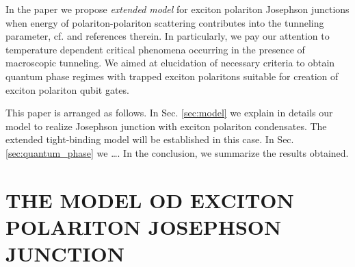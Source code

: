 \documentclass[aps, pre, preprint, groupedaddress, superscriptaddress, showkeys, showpacs] {revtex4-1}
\begin{document}
In the paper we propose \textit{extended model} for exciton polariton Josephson junctions when energy of polariton-polariton scattering contributes into the tunneling parameter, cf. \cite{Borgh,Solnyshkov_2008,Sarchi} and references therein.
In particularly, we pay our attention to temperature dependent critical phenomena occurring in the presence of macroscopic tunneling.
We aimed at elucidation of necessary criteria to obtain quantum phase regimes with trapped exciton polaritons suitable for creation of exciton polariton qubit gates.

This paper is arranged as follows.
In Sec. \ref{sec:model} we explain in details our model to realize Josephson junction with exciton polariton condensates.
The extended tight-binding model will be established in this case. In Sec. \ref{sec:quantum_phase} we \dots.
In the conclusion, we summarize the results obtained.

\section{THE MODEL OD EXCITON POLARITON JOSEPHSON JUNCTION \label{sec:model}}
\end{document}
